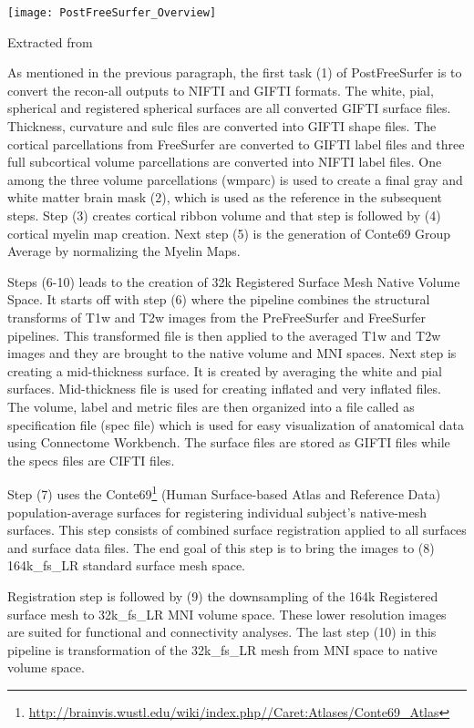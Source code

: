 \begin{center}
  \texttt{[image: PostFreeSurfer\_Overview]}
  \label{fig:postfreesurfer_overview}
  \caption*{Extracted from \cite{Gla13}}
\end{center}

As mentioned in the previous paragraph, the first task (1) of PostFreeSurfer is to convert the recon-all outputs to NIFTI and GIFTI formats. The white, pial, spherical and registered spherical surfaces are all converted GIFTI surface files. Thickness, curvature and sulc files are converted into GIFTI shape files. The cortical parcellations from FreeSurfer are converted to GIFTI label files and three full subcortical volume parcellations are converted into NIFTI label files. One among the three volume parcellations (wmparc) is used to create a final gray and white matter brain mask (2), which is used as the reference in the subsequent steps. Step (3) creates cortical ribbon volume and that step is followed by (4) cortical myelin map creation. Next step (5) is the generation of Conte69 Group Average by normalizing the Myelin Maps.

Steps (6-10) leads to the creation of 32k Registered Surface Mesh Native Volume Space. It starts off with step (6) where the pipeline combines the structural transforms of T1w and T2w images from the PreFreeSurfer and FreeSurfer pipelines. This transformed file is then applied to the averaged T1w and T2w images and they are brought to the native volume and MNI spaces. Next step is creating a mid-thickness surface. It is created by averaging the white and pial surfaces. Mid-thickness file is used for creating inflated and very inflated files. The volume, label and metric files are then organized into a file called as specification file (spec file) which is used for easy visualization of anatomical data using Connectome Workbench. The surface files are stored as GIFTI files while the specs files are CIFTI files.

Step (7) uses the Conte69\footnote{\url{http://brainvis.wustl.edu/wiki/index.php//Caret:Atlases/Conte69\_Atlas}} (Human Surface-based Atlas and Reference Data) population-average surfaces for registering individual subject's native-mesh surfaces. This step consists of combined surface registration applied to all surfaces and surface data files. The end goal of this step is to bring the images to (8) 164k\_fs\_LR standard surface mesh space. 

Registration step is followed by (9) the downsampling of the 164k Registered surface mesh to 32k\_fs\_LR MNI volume space. These lower resolution images are suited for functional and connectivity analyses. The last step (10) in this pipeline is transformation of the 32k\_fs\_LR mesh from MNI space to native volume space. 


